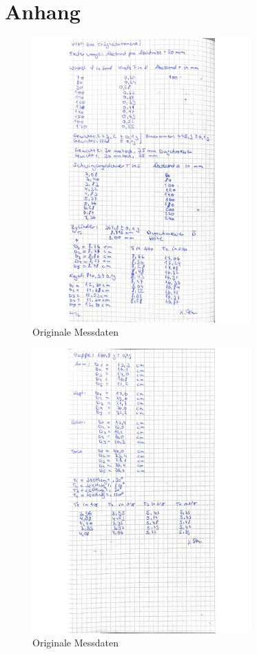 \pagebreak
\section{Anhang}
\label{sec:Anhang}


\begin{figure}
  \centering
  \includegraphics[width=0.75\textwidth]{Bilder/daten1.jpg}
  \caption{Originale Messdaten}
  \label{fig:daten1}
\end{figure}

\begin{figure}
  \centering
  \includegraphics[width=0.75\textwidth]{Bilder/daten2.jpg}
  \caption{Originale Messdaten}
  \label{fig:daten2}
\end{figure}